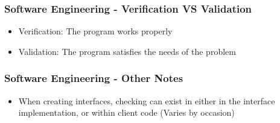 \begin{frame}\frametitle{Software Engineering - Verification VS Validation}
\begin{itemize}
\item Verification: The program works properly
\item Validation: The program satisfies the needs of the problem
\end{itemize}
\end{frame}

\begin{frame}\frametitle{Software Engineering - Other Notes}
\begin{itemize}
\item When creating interfaces, checking can exist in either in the interface implementation, or within client code (Varies by occasion)
\end{itemize}
\end{frame}
